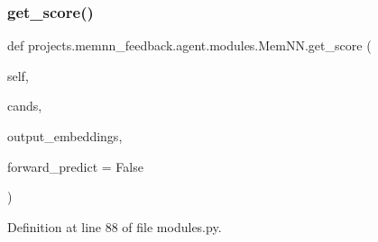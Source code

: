 \subsubsection{\texorpdfstring{get\+\_\+score()}{get\_score()}}
{\footnotesize\ttfamily def projects.\+memnn\+\_\+feedback.\+agent.\+modules.\+Mem\+N\+N.\+get\+\_\+score (\begin{DoxyParamCaption}\item[{}]{self,  }\item[{}]{cands,  }\item[{}]{output\+\_\+embeddings,  }\item[{}]{forward\+\_\+predict = {\ttfamily False} }\end{DoxyParamCaption})}



Definition at line 88 of file modules.\+py.


